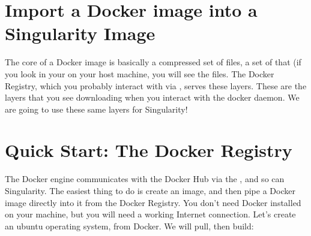 \documentclass[letterpaper,10pt,english]{sphinxmanual}
\begin{document}
\section{Import a Docker image into a Singularity Image}
\label{\detokenize{singularity_and_docker:import-a-docker-image-into-a-singularity-image}}
The core of a Docker image is basically a compressed set of files, a set
of  that (if you look in your  on your host
machine, you will see the files. The Docker Registry, which you probably interact
with via , serves these layers. These are the layers that
you see downloading when you interact with the docker daemon. We are
going to use these same layers for Singularity!


\section{Quick Start: The Docker Registry}
\label{\detokenize{singularity_and_docker:quick-start-the-docker-registry}}
The Docker engine communicates with the Docker Hub via the , and so can Singularity. The easiest thing to do is
create an image, and then pipe a Docker image directly into it from
the Docker Registry. You don’t need Docker installed on your machine,
but you will need a working Internet connection. Let’s create an
ubuntu operating system, from Docker. We will pull, then build:
\end{document}
